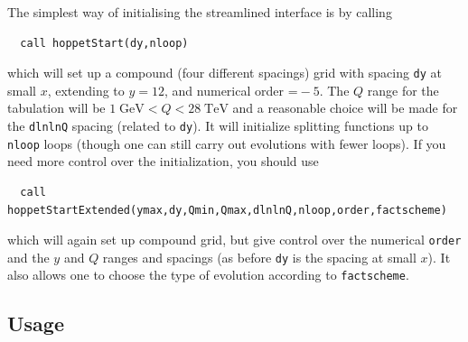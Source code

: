 \documentclass[12pt]{article}
\newcommand{\GeV}{\;\mathrm{GeV}}
\newcommand{\TeV}{\;\mathrm{TeV}}
\newcommand{\ttt}[1]{\texttt{#1}}
\begin{document}
The simplest way of initialising the 
streamlined interface is by calling
\begin{lstlisting}
  call hoppetStart(dy,nloop)
\end{lstlisting}
which will set up a compound (four different spacings) grid with
spacing \ttt{dy} at small $x$, extending to $y = 12$, and numerical
order $\ttt=-5$.  The $Q$ range for the tabulation will be $1\GeV <
Q<28 \TeV$ and a reasonable choice will be made for the \ttt{dlnlnQ}
spacing (related to \ttt{dy}). It will initialize splitting functions
up to \ttt{nloop} loops (though one can still carry out evolutions
with fewer loops).
%
If you need more control over the initialization, you should use
\begin{lstlisting}
  call hoppetStartExtended(ymax,dy,Qmin,Qmax,dlnlnQ,nloop,order,factscheme)
\end{lstlisting}
which will again set up compound grid, but give control over the
numerical \ttt{order} and the $y$ and $Q$ ranges and spacings (as
before \ttt{dy} is the spacing at small $x$). It also allows one to
choose the type of evolution according to \ttt{factscheme}.


\subsection{Usage}
\label{sec:vanilla_usage}
\end{document}
